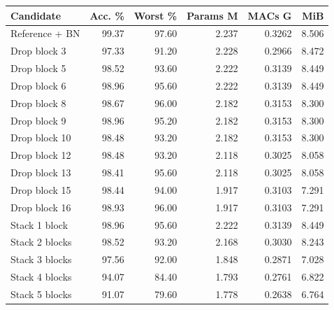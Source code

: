 \noindent\begin{minipage}[t]{0.49\textwidth}\vspace{0pt}\centering\fontsize{8.5}{10}\selectfont\setlength{\tabcolsep}{2.3pt}\renewcommand{\arraystretch}{1.16}
\begin{tabular*}{\linewidth}{@{\extracolsep{\fill}}lrrrrr@{}}\toprule
\rowcolor{slate}\textbf{Candidate} & \textbf{Acc. \%} & \textbf{Worst \%} & \textbf{Params M} & \textbf{MACs G} & \textbf{MiB}\\\midrule
Reference + BN & 99.37 & 97.60 & 2.237 & 0.3262 & 8.506\\
Drop block 3 & 97.33 & 91.20 & 2.228 & 0.2966 & 8.472\\
Drop block 5 & 98.52 & 93.60 & 2.222 & 0.3139 & 8.449\\
Drop block 6 & 98.96 & 95.60 & 2.222 & 0.3139 & 8.449\\
Drop block 8 & 98.67 & 96.00 & 2.182 & 0.3153 & 8.300\\
Drop block 9 & 98.96 & 95.20 & 2.182 & 0.3153 & 8.300\\
Drop block 10 & 98.48 & 93.20 & 2.182 & 0.3153 & 8.300\\
Drop block 12 & 98.48 & 93.20 & 2.118 & 0.3025 & 8.058\\
Drop block 13 & 98.41 & 95.60 & 2.118 & 0.3025 & 8.058\\
Drop block 15 & 98.44 & 94.00 & 1.917 & 0.3103 & 7.291\\
Drop block 16 & 98.93 & 96.00 & 1.917 & 0.3103 & 7.291\\
Stack 1 block & 98.96 & 95.60 & 2.222 & 0.3139 & 8.449\\
Stack 2 blocks & 98.52 & 93.20 & 2.168 & 0.3030 & 8.243\\
Stack 3 blocks & 97.56 & 92.00 & 1.848 & 0.2871 & 7.028\\
Stack 4 blocks & 94.07 & 84.40 & 1.793 & 0.2761 & 6.822\\
Stack 5 blocks & 91.07 & 79.60 & 1.778 & 0.2638 & 6.764\\
\bottomrule\end{tabular*}
\end{minipage}\hfill
